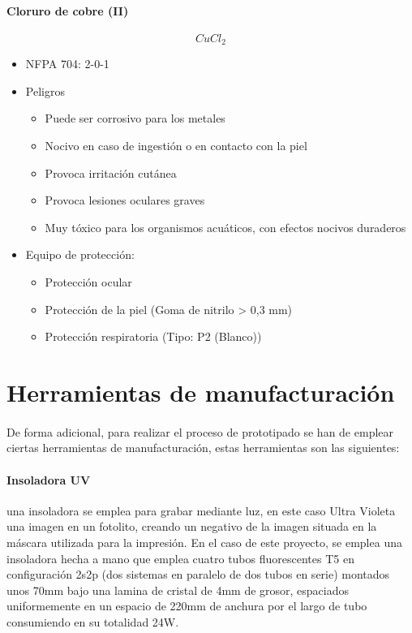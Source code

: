 \paragraph{Cloruro de cobre (II)} \textit{$$CuCl_2$$} \cite{cucl2}
\begin{itemize}
    \item NFPA 704: 2-0-1 \cite{nfpa704}
    \item Peligros
    \begin{itemize}
        \item Puede ser corrosivo para los metales
        \item Nocivo en caso de ingestión o en contacto con la piel
        \item Provoca irritación cutánea
        \item Provoca lesiones oculares graves
        \item Muy tóxico para los organismos acuáticos, con efectos nocivos duraderos
    \end{itemize}
    \item Equipo de protección: 
    \begin{itemize}
        \item Protección ocular
        \item Protección de la piel (Goma de nitrilo > 0,3 mm)
        \item Protección respiratoria (Tipo: P2 \cite{abek} (Blanco))
    \end{itemize}
\end{itemize}

\section{Herramientas de manufacturación}
\paragraph{} De forma adicional, para realizar el proceso de prototipado se han de emplear ciertas herramientas de manufacturación, estas herramientas son las siguientes:

\paragraph{Insoladora UV} una insoladora se emplea para grabar mediante luz, en este caso Ultra Violeta una imagen en un fotolito, creando un negativo de la imagen situada en la máscara utilizada para la impresión. En el caso de este proyecto, se emplea una insoladora hecha a mano que emplea cuatro tubos fluorescentes T5 en configuración 2s2p (dos sistemas en paralelo de dos tubos en serie) montados unos 70mm bajo una lamina de cristal de 4mm de grosor, espaciados uniformemente en un espacio de 220mm de anchura por el largo de tubo consumiendo en su totalidad 24W.

